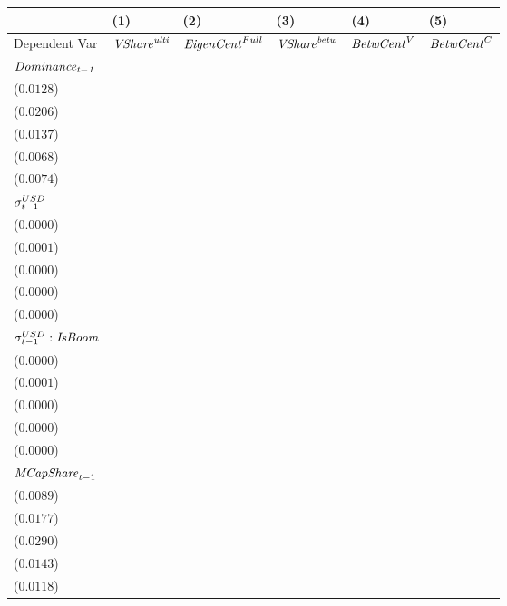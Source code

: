 \begin{tabular}{llllll}
\toprule
{} &                                       (1) &                                       (2) &                                       (3) &                                       (4) &                                       (5) \\
\midrule
Dependent Var                             &                 ${\it VShare}^{\it ulti}$ &                  ${\it EigenCent}^{Full}$ &                 ${\it VShare}^{\it betw}$ &                        ${\it BetwCent}^V$ &                        ${\it BetwCent}^C$ \\
$\it Dominance_{t-1}$                     &   \makecell{$0.8681^{***}$ \\ ($0.0128$)} &   \makecell{$0.8160^{***}$ \\ ($0.0206$)} &   \makecell{$0.8704^{***}$ \\ ($0.0137$)} &   \makecell{$0.9484^{***}$ \\ ($0.0068$)} &   \makecell{$0.9492^{***}$ \\ ($0.0074$)} \\
${\it \sigma}^{USD}_{t-1}$                &    \makecell{$-0.0000^{*}$ \\ ($0.0000$)} &   \makecell{$-0.0001^{**}$ \\ ($0.0001$)} &   \makecell{$0.0000^{***}$ \\ ($0.0000$)} &     \makecell{$0.0000^{*}$ \\ ($0.0000$)} &      \makecell{$0.0000^{}$ \\ ($0.0000$)} \\
${\it \sigma}^{USD}_{t-1}:{\it IsBoom}$   &   \makecell{$0.0000^{***}$ \\ ($0.0000$)} &   \makecell{$0.0003^{***}$ \\ ($0.0001$)} &  \makecell{$-0.0000^{***}$ \\ ($0.0000$)} &     \makecell{$-0.0000^{}$ \\ ($0.0000$)} &     \makecell{$-0.0000^{}$ \\ ($0.0000$)} \\
${\it MCapShare}_{t-1}$                   &      \makecell{$0.0113^{}$ \\ ($0.0089$)} &     \makecell{$-0.0092^{}$ \\ ($0.0177$)} &     \makecell{$-0.0031^{}$ \\ ($0.0290$)} &     \makecell{$0.0245^{*}$ \\ ($0.0143$)} &    \makecell{$0.0296^{**}$ \\ ($0.0118$)} \\

\end{tabular}
